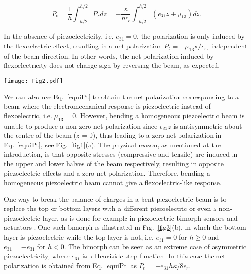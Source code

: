 \documentclass[%
 aps,prl,showpacs,
 amsmath,amssymb,
 reprint,%
]{revtex4-1}
\begin{document}
\begin{equation}
P_t =   \frac{1}{h}\int_{-h/2}^{h/2} P_z dz = - \frac{\kappa}{h\epsilon_r}\int_{-h/2}^{h/2} (e_{31} z + \mu_{13}) dz. \label{equiPt}
\end{equation}

In the absence of piezoelectricity, i.e. $e_{31} = 0$, the polarization is only induced by the flexoelectric effect, resulting in a net polarization $P_t = - \mu_{13} \kappa / \epsilon_r $, 
independent of the beam direction. In other words, the net polarization induced by flexoelectricity does not change sign by reversing the beam, as expected. 


\begin{figure*}
\centering
\texttt{[image: Fig2.pdf]}
\caption{  (a) Schematic of a cantilever beam under the point load $F$. (b) Schematic of a bimorph cantilever beam where the dark layer is piezoelectric. 
(c) A reversed configuration of the bimorph (rotated by 180$^o$). The white arrows represent the polarization direction of the layers. The color plot 
presents the electric potential ($\phi$) distribution for each bimorph obtained from Eqs.~\eqref{equiD0} and \eqref{equiPz}, where $E_z = -\phi_{,z}$. The net polarization can be obtained from the electric potential difference
of the top and bottom faces, which is identical in both bimorphs. }\label{fig3}
\end{figure*}

 
We can also use Eq.~\eqref{equiPt} to obtain the net polarization corresponding to a beam where the electromechanical response is piezoelectric instead of flexoelectric, i.e. $\mu_{13} = 0$. However,
bending a homogeneous piezoelectric beam is unable to produce 
a non-zero net polarization since $e_{31}z$ is antisymmetric about the centre of the beam ($z$ = 0), 
thus leading to a zero net polarization in Eq.~\eqref{equiPt}, see Fig.~\ref{fig1}(a). The physical reason, as mentioned at the introduction, is that opposite stresses (compressive and tensile) are induced in the upper
 and lower halves of the beam respectively, resulting in opposite piezoelectric effects and a zero net polarization. Therefore, 
 bending a homogeneous piezoelectric beam cannot give a flexoelectric-like response. 


 
One way to break the balance of charges in a bent piezoelectric beam is to replace the top 
or bottom layers with a different piezoelectric or even a non-piezoelectric layer, as is done for example in piezoelectric bimorph sensors and actuators \cite{ref:Smits1991,ref:Pritchard2001}. 
One such bimorph is illustrated in Fig.~\ref{fig3}(b), in which the bottom layer is piezoelectric while the top layer is not, i.e. $e_{31} = 0$ for $h\geq0$ and $e_{31} = -e_{31} $ for $h<0$. 
The bimorph can be seen as an extreme case of asymmetric piezoelectricity, where $e_{31}$ is a Heaviside step function. In this case the net polarization is obtained from Eq. \eqref{equiPt} as $P_t$ = $- e_{31} h \kappa /8 \epsilon_r $.
\end{document}
